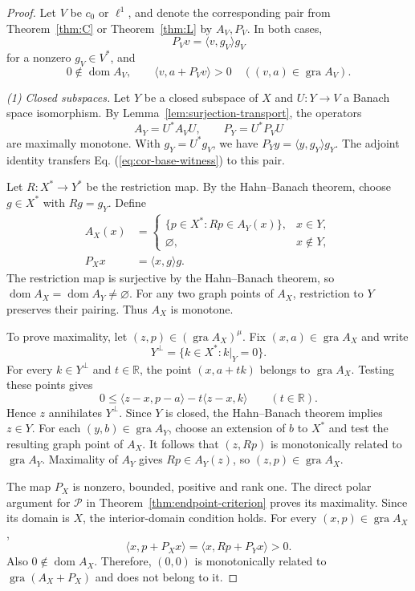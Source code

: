 \documentclass[11pt]{article}
\newcommand{\R}{\mathbb R}
\newcommand{\gra}{\operatorname{gra}}
\newcommand{\dom}{\operatorname{dom}}
\newcommand{\pair}[2]{\langle #1,#2\rangle}
\theoremstyle{definition}
\theoremstyle{remark}
\begin{document}
\begin{proof}
Let $V$ be $c_0$ or $\ell^1$, and denote the corresponding pair from Theorem~\ref{thm:C} or Theorem~\ref{thm:L} by $A_V,P_V$. In both cases,
\[
P_Vv=\pair{v}{g_V}g_V
\]
for a nonzero $g_V\in V^*$, and
\begin{equation}
0\notin\dom A_V,\qquad
\pair{v}{a+P_Vv}>0
\quad((v,a)\in\gra A_V).
\label{eq:cor-base-witness}
\end{equation}

\noindent\textit{(1) Closed subspaces.}
Let $Y$ be a closed subspace of $X$ and $U:Y\to V$ a Banach space isomorphism. By Lemma~\ref{lem:surjection-transport}, the operators
\[
A_Y=U^*A_VU,\qquad P_Y=U^*P_VU
\]
are maximally monotone. With $g_Y=U^*g_V$, we have $P_Yy=\pair{y}{g_Y}g_Y$. The adjoint identity transfers Eq. (\ref{eq:cor-base-witness}) to this pair.

Let $R:X^*\to Y^*$ be the restriction map. By the Hahn--Banach theorem, choose $g\in X^*$ with $Rg=g_Y$. Define
\[
\begin{aligned}
A_X(x)&=
\begin{cases}
\{p\in X^*:Rp\in A_Y(x)\},&x\in Y,\\
\varnothing,&x\notin Y,
\end{cases}\\
P_Xx&=\pair{x}{g}g.
\end{aligned}
\]
The restriction map is surjective by the Hahn--Banach theorem, so $\dom A_X=\dom A_Y\ne\varnothing$. For any two graph points of $A_X$, restriction to $Y$ preserves their pairing. Thus $A_X$ is monotone.

To prove maximality, let $(z,p)\in(\gra A_X)^\mu$. Fix $(x,a)\in\gra A_X$ and write
\[
Y^\perp=\{k\in X^*:k|_Y=0\}.
\]
For every $k\in Y^\perp$ and $t\in\R$, the point $(x,a+tk)$ belongs to $\gra A_X$. Testing these points gives
\[
0\le\pair{z-x}{p-a}-t\pair{z-x}{k}
\qquad(t\in\R).
\]
Hence $z$ annihilates $Y^\perp$. Since $Y$ is closed, the Hahn--Banach theorem implies $z\in Y$. For each $(y,b)\in\gra A_Y$, choose an extension of $b$ to $X^*$ and test the resulting graph point of $A_X$. It follows that $(z,Rp)$ is monotonically related to $\gra A_Y$. Maximality of $A_Y$ gives $Rp\in A_Y(z)$, so $(z,p)\in\gra A_X$.

The map $P_X$ is nonzero, bounded, positive and rank one. The direct polar argument for $\mathcal P$ in Theorem~\ref{thm:endpoint-criterion} proves its maximality. Since its domain is $X$, the interior-domain condition holds. For every $(x,p)\in\gra A_X$,
\[
\pair{x}{p+P_Xx}
=\pair{x}{Rp+P_Yx}>0.
\]
Also $0\notin\dom A_X$. Therefore, $(0,0)$ is monotonically related to $\gra(A_X+P_X)$ and does not belong to it.


\end{proof}
\end{document}
